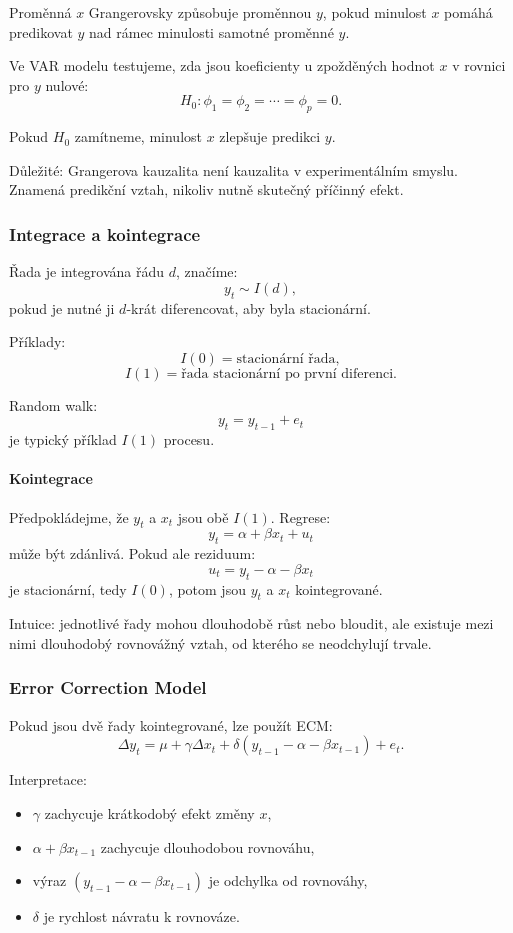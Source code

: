 Proměnná $x$ Grangerovsky způsobuje proměnnou $y$, pokud minulost $x$ pomáhá predikovat $y$
nad rámec minulosti samotné proměnné $y$.

Ve VAR modelu testujeme, zda jsou koeficienty u zpožděných hodnot $x$ v rovnici pro $y$ nulové:
\[
    H_0:\phi_1=\phi_2=\cdots=\phi_p=0.
\]

Pokud $H_0$ zamítneme, minulost $x$ zlepšuje predikci $y$.

Důležité: Grangerova kauzalita není kauzalita v experimentálním smyslu. Znamená predikční vztah,
nikoliv nutně skutečný příčinný efekt.

\subsubsection{Integrace a kointegrace}

Řada je integrována řádu $d$, značíme:
\[
    y_t \sim I(d),
\]
pokud je nutné ji $d$-krát diferencovat, aby byla stacionární.

Příklady:
\[
    I(0) = \text{stacionární řada},
\]
\[
    I(1) = \text{řada stacionární po první diferenci}.
\]

Random walk:
\[
    y_t=y_{t-1}+e_t
\]
je typický příklad $I(1)$ procesu.

\paragraph{Kointegrace}

Předpokládejme, že $y_t$ a $x_t$ jsou obě $I(1)$.
Regrese:
\[
    y_t=\alpha+\beta x_t+u_t
\]
může být zdánlivá. Pokud ale reziduum:
\[
    u_t=y_t-\alpha-\beta x_t
\]
je stacionární, tedy $I(0)$, potom jsou $y_t$ a $x_t$ kointegrované.

Intuice: jednotlivé řady mohou dlouhodobě růst nebo bloudit, ale existuje mezi nimi dlouhodobý
rovnovážný vztah, od kterého se neodchylují trvale.

\subsubsection{Error Correction Model}

Pokud jsou dvě řady kointegrované, lze použít ECM:
\[
    \Delta y_t =
    \mu+\gamma\Delta x_t
    +\delta(y_{t-1}-\alpha-\beta x_{t-1})
    +e_t.
\]

Interpretace:
\begin{itemize}
    \item $\gamma$ zachycuje krátkodobý efekt změny $x$,
    \item $\alpha+\beta x_{t-1}$ zachycuje dlouhodobou rovnováhu,
    \item výraz $(y_{t-1}-\alpha-\beta x_{t-1})$ je odchylka od rovnováhy,
    \item $\delta$ je rychlost návratu k rovnováze.
\end{itemize}

